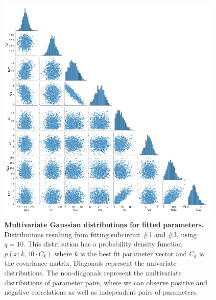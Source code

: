 \begin{figure}[H] %
    \centering
    \begin{adjustbox}{center}
        \includegraphics[width=1\textwidth]{chapters/Chapter 2/multivariate_from_fit} %
    \end{adjustbox}
    \caption{\textbf{Multivariate Gaussian distributions for fitted parameters.}
    Distributions resulting from fitting subcircuit \#1 and \#3, using $q=10$.
    This distribution has a probability density function $p(x;k,10\cdot C_{k})$
        where $k$ is the best fit parameter vector and $C_{k}$ is the covariance matrix.
    Diagonals represent the univariate distributions.
    The non-diagonals represent the multivariate distributions of parameter pairs, where we can observe positive and negative correlations as well as independent pairs of parameters.}
    \label{fig:multivariate_from_fit} %
\end{figure}

